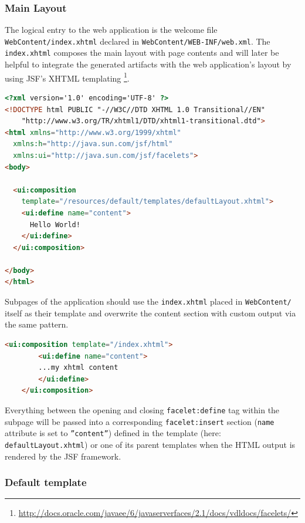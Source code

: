 \subsubsection{Main Layout}
\label{subsec:referenceMainLayout} 

The logical entry to the web application is the welcome file
\texttt{WebContent/index.xhtml} declared in
\texttt{WebContent/WEB-INF/web.xml}. The \texttt{index.xhtml} composes the
main layout with page contents and will later be helpful to integrate the
generated artifacts with the web application's layout by using JSF's XHTML
templating
\footnote{\url{http://docs.oracle.com/javaee/6/javaserverfaces/2.1/docs/vdldocs/facelets/}}.

\begin{lstlisting}[language=HTML]
<?xml version='1.0' encoding='UTF-8' ?>
<!DOCTYPE html PUBLIC "-//W3C//DTD XHTML 1.0 Transitional//EN" 
    "http://www.w3.org/TR/xhtml1/DTD/xhtml1-transitional.dtd">
<html xmlns="http://www.w3.org/1999/xhtml"
  xmlns:h="http://java.sun.com/jsf/html"
  xmlns:ui="http://java.sun.com/jsf/facelets">
<body>

  <ui:composition
    template="/resources/default/templates/defaultLayout.xhtml">
    <ui:define name="content">
      Hello World!
    </ui:define>
  </ui:composition>

</body>
</html>
\end{lstlisting}
 
Subpages of the application should use the \texttt{index.xhtml} placed in
\texttt{WebContent/} itself as their template and overwrite the content section
with custom output via the same pattern.

\begin{lstlisting}[language=HTML] 
	<ui:composition template="/index.xhtml">
  		<ui:define name="content">
  		...my xhtml content
  		</ui:define>
 	</ui:composition>
\end{lstlisting}

Everything between the opening and closing \texttt{facelet:define} tag within
the subpage will be passed into a corresponding \texttt{facelet:insert} section
(\texttt{name} attribute is set to \texttt{''content''}) defined in the template
(here: \texttt{defaultLayout.xhtml}) or one of its parent templates when the HTML output is rendered by the JSF framework.

\subsubsection*{Default template}

